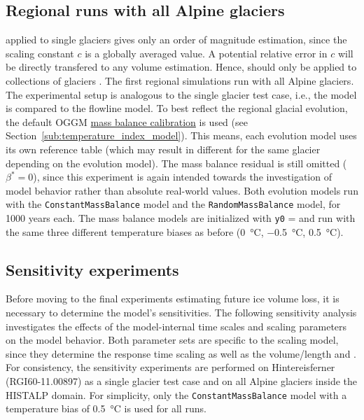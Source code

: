     \subsection{Regional runs with all Alpine glaciers} %
    \label{sub:regional_runs_with_all_alpine_glaciers_setup}
        \Vas{} applied to single glaciers gives only an order of magnitude estimation, since the scaling constant $c$ is a globally averaged value. A potential relative error in $c$ will be directly transfered to any volume estimation. Hence, \vas{} should only be applied to collections of glaciers \citep{Bahr2015}. 
        The first regional simulations run with all Alpine glaciers. The experimental setup is analogous to the single glacier test case, i.e., the \vas{} model is compared to the flowline model. To best reflect the regional glacial evolution, the default OGGM \hyperref[ssub:mb_calib]{mass balance calibration} is used (see Section~\ref{sub:temperature_index_model}). This means, each evolution model uses its own \tstar{} reference table (which may result in different \tstar{} for the same glacier depending on the evolution model). The mass balance residual is still omitted ($\beta^* = 0$), since this experiment is again intended towards the investigation of model behavior rather than absolute real-world values.
        Both evolution models run with the \lstinline`ConstantMassBalance` model and the \lstinline`RandomMassBalance` model, for 1000 years each. The mass balance models are initialized with \lstinline`y0` = \tstar{} and run with the same three different temperature biases as before (\SI{0}{\celsius}, \SI{-0.5}{\celsius}, \SI{+0.5}{\celsius}).
    

    \subsection{Sensitivity experiments} %
    \label{sub:sensitivity_experiments_setup}
        Before moving to the final experiments estimating future ice volume loss, it is necessary to determine the model's sensitivities. The following sensitivity analysis investigates the effects of the model-internal time scales and scaling parameters on the model behavior. Both parameter sets are specific to the scaling model, since they determine the response time scaling as well as the volume/length and \vas{}. For consistency, the sensitivity experiments are performed on Hintereisferner (RGI60-11.00897) as a single glacier test case and on all Alpine glaciers inside the HISTALP domain. For simplicity, only the \lstinline`ConstantMassBalance` model with a temperature bias of \SI{+0.5}{\celsius} is used for all runs.

